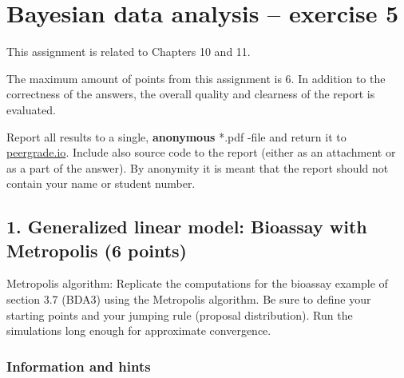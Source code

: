 \documentclass[a4paper,11pt]{article}
\begin{document}
\thispagestyle{empty}

\section*{Bayesian data analysis -- exercise 5}

This assignment is related to Chapters 10 and 11.

The maximum amount of points from this assignment is 6. In addition to the correctness of the answers, the overall quality and clearness of the report is evaluated.

Report all results to a single, {\bf anonymous} *.pdf -file and return it to \href{peergrade.io}{peergrade.io}. Include also source code to the report (either as an attachment or as a part of the answer). By anonymity it is meant that the report should not contain your name or student number.

\vspace{1cm}





\subsection*{1. Generalized linear model: Bioassay with Metropolis (6 points)}

Metropolis algorithm: Replicate the computations for the bioassay
example of section 3.7 (BDA3) using the Metropolis algorithm. Be sure
to define your starting points and your jumping rule (proposal distribution). Run the
simulations long enough for approximate convergence.


\subsubsection*{Information and hints}
\end{document}
